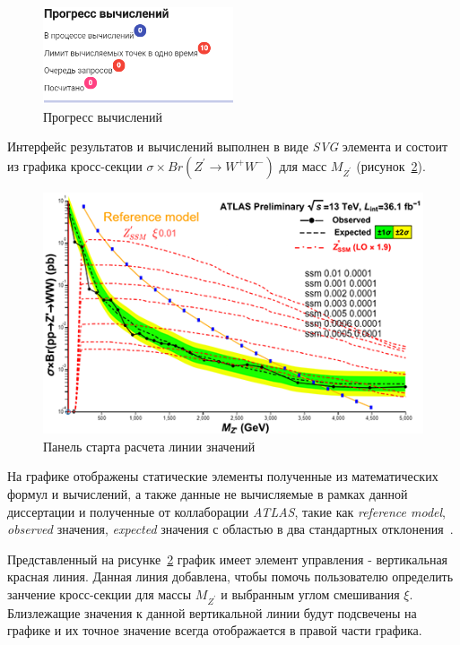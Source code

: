 \begin{figure}[!h]
	\centering
	\includegraphics[width=0.5\textwidth]{figures/progress.png}
	\caption{Прогресс вычислений}
	\label{fig:progress}
\end{figure}

Интерфейс результатов и вычислений выполнен в виде \textit{SVG} элемента и состоит из графика кросс-секции $\sigma \times Br({Z}^{\prime} \rightarrow {W}^{+}{W}^{-})$ для масс ${M}_{{Z}^{\prime}}$ (рисунок~\ref{fig:graph-1}).

\begin{figure}[!h]
	\centering
	\includegraphics[width=\textwidth]{figures/graph-1.png}
	\caption{Панель старта расчета линии значений}
	\label{fig:graph-1}
\end{figure}

На графике отображены статические элементы полученные из математических формул и вычислений, а также данные не вычисляемые в рамках данной диссертации и полученные от коллаборации \textit{ATLAS}, такие  как \textit{reference model}, \textit{observed} значения, \textit{expected} значения с областью в два стандартных отклонения~\cite{2part-pankov}.

Представленный на рисунке~\ref{fig:graph-1} график имеет элемент управления - вертикальная красная линия. Данная линия добавлена, чтобы помочь пользователю определить занчение кросс-секции для массы ${M}_{{Z}^{\prime}}$ и выбранным углом смешивания $\xi$. Близлежащие значения к данной вертикальной линии будут подсвечены на графике и их точное значение всегда отображается в правой части графика.

